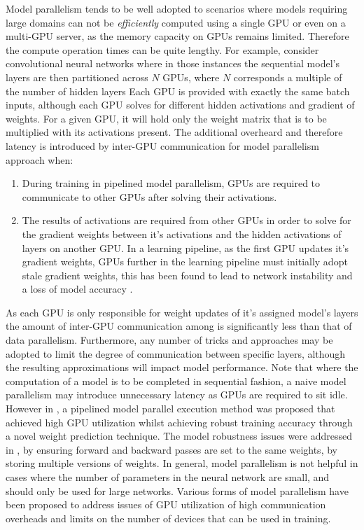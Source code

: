 \documentclass[10pt]{article}[draft]
\begin{document}
 Model parallelism  tends to be well adopted to scenarios  where  models requiring large domains can not be \emph{efficiently} computed using a single GPU or even on a multi-GPU server, as the memory capacity on GPUs remains limited. Therefore the compute operation times can be quite lengthy. For example, consider convolutional neural networks where in those instances the sequential model's layers are then partitioned across $N$ GPUs, where $N$ corresponds a multiple of the number of hidden layers \cite{[76] A. Coates and A. Ng. Learning feature representations with k-means. Neural networks: Tricks of the Trade} Each GPU is provided with exactly the same batch inputs, although each GPU solves for different hidden activations and gradient of weights. For a given GPU, it will hold only the weight matrix that is to be  multiplied with its  activations present. The additional overheard and therefore latency is introduced by inter-GPU communication for  model parallelism approach when:
 \begin{enumerate}
\item  During training  in pipelined model parallelism, GPUs are required to communicate to other GPUs after solving their activations. 
 \item The results of  activations are required from other GPUs  in order to solve for the gradient weights between it's activations and the hidden activations of  layers on another GPU. In a learning pipeline, as the first GPU updates it's gradient weights, GPUs further in the learning pipeline must initially adopt stale gradient weights, this  has been found to lead to network instability and a loss of model accuracy \cite{https://arxiv.org/pdf/1809.02839.pdf}. 
  \end{enumerate}
As each GPU is only responsible for  weight updates of it's assigned model's layers the amount of inter-GPU communication among  is significantly less than that of data parallelism. Furthermore, any number of tricks and approaches may be adopted to limit the degree of communication between specific layers, although the resulting approximations will impact model performance. Note that where the computation of a model is to be completed in sequential fashion, a naive model parallelism may introduce unnecessary latency as GPUs are required to sit idle. However in \cite{https://arxiv.org/pdf/1809.02839.pdf}, a pipelined model parallel execution method was proposed that achieved high GPU utilization whilst achieving robust training accuracy through a novel weight prediction technique. The model robustness issues were addressed in \cite{Pipedream: Fast and efficient pipeline parallel DNN
training.}, by ensuring forward and backward passes are set to the same weights, by storing multiple versions of weights. In general, model parallelism is not helpful in cases where the number of parameters in the neural network are small, and should only be used for large networks. Various forms of model parallelism have been proposed to  address issues of GPU utilization of high communication overheads and limits on the number of devices that can be used in training.
\end{document}
